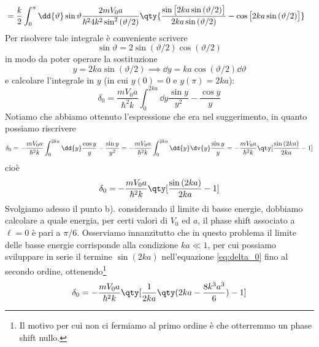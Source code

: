 \begin{soluzione}
\begin{equation*}
\begin{split}
         & =\frac{k}{2} \int_{0}^{\pi} \dd{\vartheta} \sin{\vartheta} \frac{2m V_0 a}{\hbar^2 4 k^2 \sin^2{(\vartheta/2)}} \qty{ \frac{ \sin{ \bigl[ 2ka \sin{(\vartheta/2)} \bigr] } }{ 2ka \sin{ (\vartheta/2) } } - \cos{ \bigl[ 2ka \sin{(\vartheta/2)} \bigr] } }
      \end{split}
   \end{equation*}
   Per risolvere tale integrale è conveniente scrivere
   \begin{equation*}
      \sin{\vartheta}
      =2 \sin{(\vartheta/2)} \cos{(\vartheta/2)}
   \end{equation*}
   in modo da poter operare la sostituzione
   \begin{equation*}
      y=2ka \sin{(\vartheta/2)}
      \implies
      \dd{y}=ka \cos{(\vartheta/2)} \dd{\vartheta}
   \end{equation*}
   e calcolare l'integrale in $y$ (in cui $y(0)=0$ e $y(\pi)=2ka$):
   \begin{equation*}
      \delta_0
      =\frac{m V_0 a}{\hbar^2 k} \int_{0}^{2ka} \dd{y} \frac{\sin{y}}{y^2} - \frac{\cos{y}}{y}
   \end{equation*}
   Notiamo che abbiamo ottenuto l'espressione che era nel suggerimento, in quanto possiamo riscrivere
   \begin{equation*}
      \delta_0
      =-\frac{m V_0 a}{\hbar^2 k} \int_{0}^{2ka} \dd{y} \frac{\cos{y}}{y} - \frac{\sin{y}}{y^2}
      =-\frac{m V_0a}{\hbar^2 k} \int_{0}^{2ka} \dd{y} \dv{y} \frac{\sin{y}}{y}
      =-\frac{m V_0 a}{\hbar^2 k} \qty[ \frac{\sin{(2ka)}}{2ka} - 1 ]
   \end{equation*}
   cioè
   \begin{equation}
      \delta_0
      =-\frac{m V_0 a}{\hbar^2 k} \qty[ \frac{\sin{(2ka)}}{2ka} - 1 ]
      \label{eq:delta_0}
   \end{equation}
   Svolgiamo adesso il punto b). considerando il limite di basse energie, dobbiamo calcolare a quale energia, per certi valori di $V_0$ ed $a$, il phase shift associato a $\ell=0$ è pari a $\pi/6$. Osserviamo innanzitutto che in questo problema il limite delle basse energie corrisponde alla condizione $ka \ll 1$, per cui possiamo sviluppare in serie il termine $\sin{(2ka)}$ nell'equazione \eqref{eq:delta_0} fino al secondo ordine, ottenendo\footnote{Il motivo per cui non ci fermiamo al primo ordine è che otterremmo un phase shift nullo.}
   \begin{equation*}
      \delta_0
      =-\frac{m V_0 a}{\hbar^2 k} \qty[ \frac{1}{2ka} \qty( 2ka - \frac{8k^3a^3}{6} ) - 1 ]

\end{equation*}
\end{soluzione}
